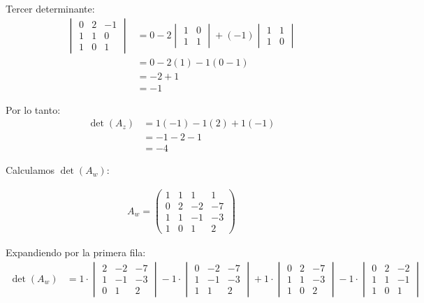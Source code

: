 \documentclass{article}
\begin{document}
Tercer determinante:
\begin{align}
    \begin{vmatrix} 0 & 2 & -1 \\ 1 & 1 & 0 \\ 1 & 0 & 1 \end{vmatrix} &= 0 - 2 \begin{vmatrix} 1 & 0 \\ 1 & 1 \end{vmatrix} + (-1) \begin{vmatrix} 1 & 1 \\ 1 & 0 \end{vmatrix} \\
    &= 0 - 2(1) - 1(0 - 1) \\
    &= -2 + 1 \\
    &= -1
\end{align}

Por lo tanto:
\begin{align}
    \det(A_z) &= 1(-1) - 1(2) + 1(-1) \\
    &= -1 - 2 - 1 \\
    &= -4
\end{align}

Calculamos $\det(A_w)$:

\begin{align}
    A_w = \begin{pmatrix}
    1 & 1 & 1 & 1 \\
    0 & 2 & -2 & -7 \\
    1 & 1 & -1 & -3 \\
    1 & 0 & 1 & 2
    \end{pmatrix}
\end{align}

Expandiendo por la primera fila:
\begin{align}
    \det(A_w) &= 1 \cdot \begin{vmatrix} 2 & -2 & -7 \\ 1 & -1 & -3 \\ 0 & 1 & 2 \end{vmatrix} - 1 \cdot \begin{vmatrix} 0 & -2 & -7 \\ 1 & -1 & -3 \\ 1 & 1 & 2 \end{vmatrix} + 1 \cdot \begin{vmatrix} 0 & 2 & -7 \\ 1 & 1 & -3 \\ 1 & 0 & 2 \end{vmatrix} - 1 \cdot \begin{vmatrix} 0 & 2 & -2 \\ 1 & 1 & -1 \\ 1 & 0 & 1 \end{vmatrix}
\end{align}
\end{document}
